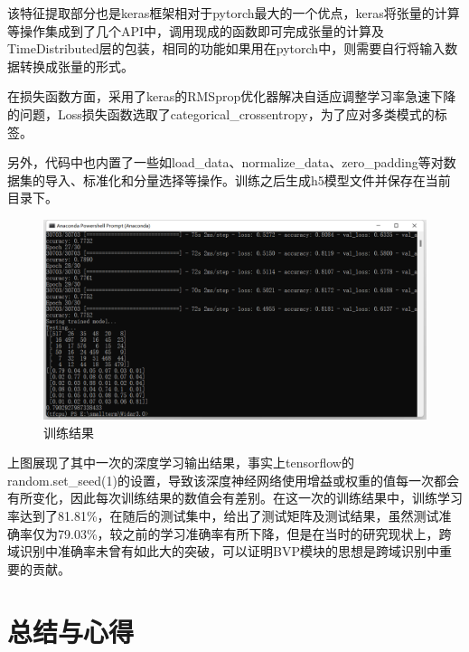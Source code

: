 \documentclass[a4paper]{article}
\begin{document}
  该特征提取部分也是keras框架相对于pytorch最大的一个优点，keras将张量的计算等操作集成到了几个API中，调用现成的函数即可完成张量的计算及TimeDistributed层的包装，相同的功能如果用在pytorch中，则需要自行将输入数据转换成张量的形式。 \par
  在损失函数方面，采用了keras的RMSprop优化器解决自适应调整学习率急速下降的问题，Loss损失函数选取了categorical\_crossentropy，为了应对多类模式的标签。\par
  另外，代码中也内置了一些如load\_data、normalize\_data、zero\_padding等对数据集的导入、标准化和分量选择等操作。训练之后生成h5模型文件并保存在当前目录下。
                \begin{figure}[H]
                \centering
                \includegraphics[width=16cm]{images/result.png}
                \caption{训练结果}
                \label{fig1}
              \end{figure}
  上图展现了其中一次的深度学习输出结果，事实上tensorflow的random.set\_seed(1)的设置，导致该深度神经网络使用增益或权重的值每一次都会有所变化，因此每次训练结果的数值会有差别。在这一次的训练结果中，训练学习率达到了81.81\%，在随后的测试集中，给出了测试矩阵及测试结果，虽然测试准确率仅为79.03\%，较之前的学习准确率有所下降，但是在当时的研究现状上，跨域识别中准确率未曾有如此大的突破，可以证明BVP模块的思想是跨域识别中重要的贡献。 \par

\clearpage
\section{总结与心得}
\end{document}
